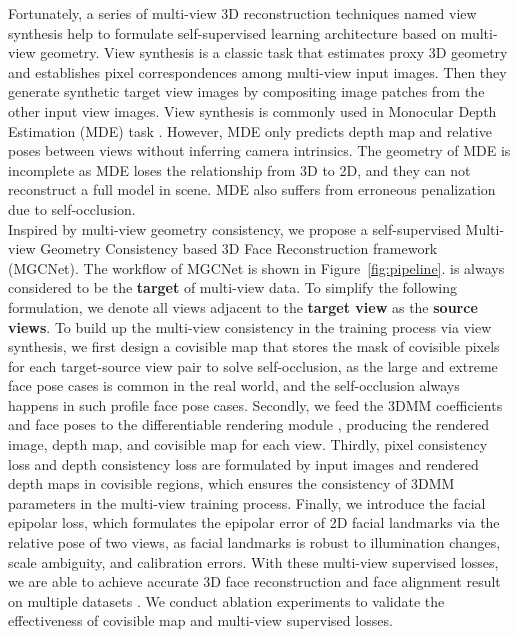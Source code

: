 \documentclass[runningheads]{llncs}
\begin{document}
Fortunately, a series of multi-view 3D reconstruction techniques named view synthesis \cite{warp_chen1993view,debevec1996modeling,warp_fitzgibbon2005image} help to formulate self-supervised learning architecture based on multi-view geometry. View synthesis is a classic task that estimates proxy 3D geometry and establishes pixel correspondences among multi-view input images. Then they generate  synthetic target view images by compositing image patches from the other  input view images. View synthesis is commonly used in Monocular Depth Estimation (MDE) task \cite{monode_zhou2017unsupervised,monode_zhan2018unsupervised,monode_mahjourian2018unsupervised,monode_casser2019depth}. However, MDE only predicts depth map and relative poses between views without inferring camera intrinsics. The geometry of MDE is incomplete as MDE loses the relationship from 3D to 2D, and they can not reconstruct a full model in scene.
MDE also suffers from erroneous penalization due to self-occlusion. \\
\indent Inspired by multi-view geometry consistency, we propose a self-supervised Multi-view Geometry Consistency based 3D Face Reconstruction framework (MGCNet). 
The workflow of MGCNet is shown in Figure~\ref{fig:pipeline}.
 is always considered to be the \textbf{target} of multi-view data.
To simplify the following formulation, we denote all  views adjacent to the \textbf{target view} as the \textbf{source views}.
To build up the multi-view consistency in the training process via view synthesis, we first design a covisible map that stores the mask of covisible pixels for each target-source view pair to solve self-occlusion, as the large and extreme face pose cases is common in the real world, and the self-occlusion always happens in such profile face pose cases. 
Secondly, we feed the 3DMM coefficients and face poses to the differentiable rendering module \cite{unsuper_genova2018unsupervised}, producing the rendered image, depth map, and covisible map for each view. 
Thirdly, pixel consistency loss and depth consistency loss are formulated by input images and rendered depth maps in covisible regions, which ensures the consistency of 3DMM parameters in the multi-view training process. 
Finally, we introduce the facial epipolar loss, which formulates the epipolar error of 2D facial landmarks via the relative pose of two views,
as facial landmarks is robust to illumination changes, scale ambiguity, and calibration errors.
With these multi-view supervised losses, we are able to achieve accurate 3D face reconstruction and face alignment result on multiple datasets \cite{dataset_aflw20003D_300WLP_zhu2016face,dataset_florence,dataset_bu3dfe_yin20063d,dataset_bu4dfe_yin20063d,dataset_frgc}. 
We conduct ablation experiments to validate the effectiveness of covisible map and multi-view supervised losses.
\end{document}
